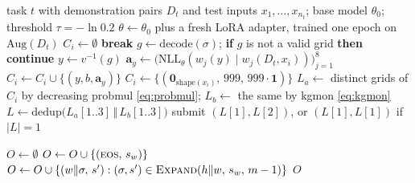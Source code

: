 \documentclass[11pt]{article}
\newcommand{\code}[1]{\texttt{#1}}
\newcommand{\R}[1]{R#1}
\begin{document}
\begin{algorithm}[t]
\caption{The NVARC solver for one task, as run in our notebooks (code of \R{2}). In the code, the batches of different test inputs of a task are interleaved.}
\label{alg:solver}
\begin{algorithmic}[1]
\Require task $t$ with demonstration pairs $D_t$ and test inputs $x_1,\dots,x_{n_t}$; base model $\theta_0$; threshold $\tau=-\ln 0.2$
\State $\theta \gets \theta_0$ plus a fresh LoRA adapter, trained one epoch on $\mathrm{Aug}(D_t)$ 
  \State $C_i \gets \emptyset$ 
   
     \textbf{break} \EndIf
     
      \State $g \gets \mathrm{decode}(\sigma)$; \textbf{if} $g$ is not a valid grid \textbf{then continue}
      \State $y \gets v^{-1}(g)$ 
        \State $\mathbf{a}_y \gets \big(\mathrm{NLL}_\theta(w_j(y) \mid w_j(D_t, x_i))\big)_{j=1}^{8}$ 
      \EndIf
      \State $C_i \gets C_i \cup \{(y, b, \mathbf{a}_y)\}$
    \EndFor
  \EndFor
   $C_i \gets \{(\mathbf{0}_{\mathrm{shape}(x_i)},\, 999,\, 999\cdot\mathbf{1})\}$  \EndIf
  \State $L_a \gets$ distinct grids of $C_i$ by decreasing probmul \eqref{eq:probmul}; $L_b \gets$ the same by kgmon \eqref{eq:kgmon}
  \State $L \gets \mathrm{dedup}\big(L_a[1..3] \,\Vert\, L_b[1..3]\big)$
  \State submit $(L[1], L[2])$, or $(L[1], L[1])$ if $|L| = 1$ 
\EndFor
\end{algorithmic}
\end{algorithm}

\begin{algorithm}[t]
\caption{Thresholded depth-first search (\code{turbo\_dfs}) for one view. In the code, the views of a batch are searched together, and a call stops after 540\,s. $K$ is 10 in \R{2} and 5 in \R{1}, A and D; it never binds (\cref{sec:pipeline}).}
\label{alg:dfs}
\begin{algorithmic}[1]
  \State \Return {} 
\EndFunction
{} 
  \State $O \gets \emptyset$
      \State $O \gets O \cup \{(\textsc{eos},\, s_w)\}$
      \State $O \gets O \cup \{(w \Vert \sigma,\, s') : (\sigma, s') \in \Call{Expand}{h \Vert w,\, s_w,\, m-1}\}$
    \EndIf
  \EndFor
  \State \Return $O$
\EndFunction
\end{algorithmic}
\end{algorithm}
\end{document}
